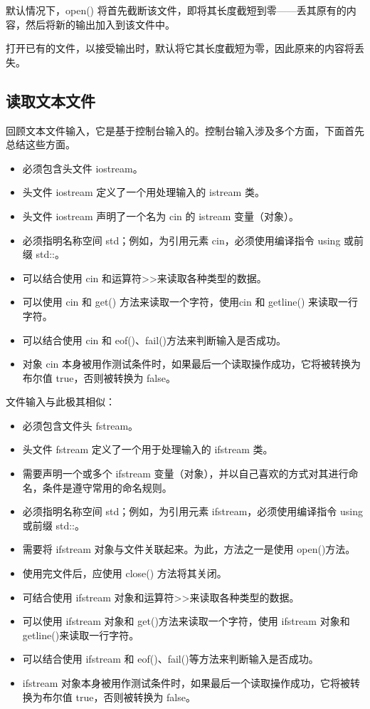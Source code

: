 默认情况下，open() 将首先截断该文件，即将其长度截短到零——丢其原有的内容，然后将新的输出加入到该文件中。
\begin{marker}
	打开已有的文件，以接受输出时，默认将它其长度截短为零，因此原来的内容将丢失。
\end{marker}
\subsection{读取文本文件}
回顾文本文件输入，它是基于控制台输入的。控制台输入涉及多个方面，下面首先总结这些方面。
\begin{itemize}
	\setlength{\itemsep}{0pt}
	\setlength{\parsep}{0pt}
	\setlength{\parskip}{0pt}
	\item 必须包含头文件 iostream。
	\item 头文件 iostream 定义了一个用处理输入的 istream 类。 
	\item 头文件 iostream 声明了一个名为 cin 的 istream 变量（对象）。
	\item 必须指明名称空间 std；例如，为引用元素 cin，必须使用编译指令 using 或前缀 std::。
	\item 可以结合使用 cin 和运算符>>来读取各种类型的数据。
	\item 可以使用 cin 和 get() 方法来读取一个字符，使用cin 和 getline() 来读取一行字符。
	\item 可以结合使用 cin 和 eof()、fail()方法来判断输入是否成功。
	\item 对象 cin 本身被用作测试条件时，如果最后一个读取操作成功，它将被转换为布尔值 true，否则被转换为 false。
\end{itemize}
文件输入与此极其相似：
\begin{itemize}
	\setlength{\itemsep}{0pt}
	\setlength{\parsep}{0pt}
	\setlength{\parskip}{0pt}
	\item 必须包含文件头 fstream。
	\item 头文件 fstream 定义了一个用于处理输入的 ifstream 类。
	\item 需要声明一个或多个 ifstream 变量（对象），并以自己喜欢的方式对其进行命名，条件是遵守常用的命名规则。
	\item 必须指明名称空间 std；例如，为引用元素 ifstream，必须使用编译指令 using 或前缀 std::。
	\item 需要将 ifstream 对象与文件关联起来。为此，方法之一是使用 open()方法。
	\item 使用完文件后，应使用 close() 方法将其关闭。
	\item 可结合使用 ifstream 对象和运算符>>来读取各种类型的数据。
	\item 可以使用 ifstream 对象和 get()方法来读取一个字符，使用 ifstream 对象和 getline()来读取一行字符。
	\item 可以结合使用 ifstream 和 eof()、fail()等方法来判断输入是否成功。
	\item  ifstream 对象本身被用作测试条件时，如果最后一个读取操作成功，它将被转换为布尔值 true，否则被转换为 false。
\end{itemize}
